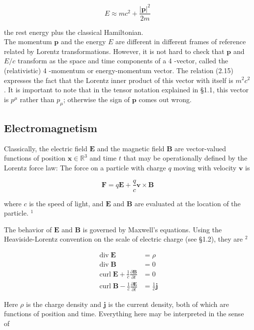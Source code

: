 \documentclass[10pt, letterpaper]{article}
\begin{document}
$$
E \approx m c^{2}+\frac{|\mathbf{p}|^{2}}{2 m}
$$

the rest energy plus the classical Hamiltonian.\\
The momentum $\mathbf{p}$ and the energy $E$ are different in different frames of reference related by Lorentz transformations. However, it is not hard to check that $\mathbf{p}$ and $E / c$ transform as the space and time components of a 4 -vector, called the (relativistic) 4 -momentum or energy-momentum vector. The relation (2.15) expresses the fact that the Lorentz inner product of this vector with itself is $m^{2} c^{2}$. It is important to note that in the tensor notation explained in §1.1, this vector is $p^{\mu}$ rather than $p_{\mu}$; otherwise the sign of $\mathbf{p}$ comes out wrong.

\subsection*{Electromagnetism}
Classically, the electric field $\mathbf{E}$ and the magnetic field $\mathbf{B}$ are vector-valued functions of position $\mathbf{x} \in \mathbb{R}^{3}$ and time $t$ that may be operationally defined by the Lorentz force law: The force on a particle with charge $q$ moving with velocity $\mathbf{v}$ is

$$
\mathbf{F}=q \mathbf{E}+\frac{q}{c} \mathbf{v} \times \mathbf{B}
$$

where $c$ is the speed of light, and $\mathbf{E}$ and $\mathbf{B}$ are evaluated at the location of the particle. ${ }^{1}$

The behavior of $\mathbf{E}$ and $\mathbf{B}$ is governed by Maxwell's equations. Using the Heaviside-Lorentz convention on the scale of electric charge (see §1.2), they are ${ }^{2}$

$$
\begin{aligned}
\operatorname{div} \mathbf{E} & =\rho \\
\operatorname{div} \mathbf{B} & =0 \\
\operatorname{curl} \mathbf{E}+\frac{1}{c} \frac{\partial \mathbf{B}}{\partial t} & =0 \\
\operatorname{curl} \mathbf{B}-\frac{1}{c} \frac{\partial \mathbf{E}}{\partial t} & =\frac{1}{c} \mathbf{j}
\end{aligned}
$$

Here $\rho$ is the charge density and $\mathbf{j}$ is the current density, both of which are functions of position and time. Everything here may be interpreted in the sense of
\end{document}
